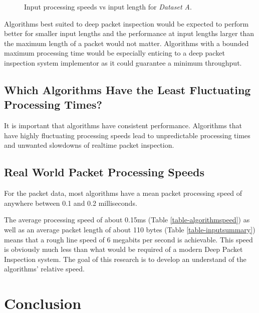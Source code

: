 \documentclass[11pt]{article}
\begin{document}
\begin{figure}[t]
    \centering
    
    \caption{Input processing speeds vs input length for \textit{Dataset A}.}
\end{figure}

Algorithms best suited to deep packet inspection would be expected to perform better for smaller input lengths and the performance at input lengths larger than the maximum length of a packet would not matter. Algorithms with a bounded maximum processing time would be especially enticing to a deep packet inspection system implementor as it could guarantee a minimum throughput.

\subsection{Which Algorithms Have the Least Fluctuating Processing Times?}

It is important that algorithms have consistent performance. Algorithms that have highly fluctuating processing speeds lead to unpredictable processing times and unwanted slowdowns of realtime packet inspection.

\subsection{Real World Packet Processing Speeds}

For the packet data, most algorithms have a mean packet processing speed of anywhere between 0.1 and 0.2 milliseconds.

The average processing speed of about 0.15ms (Table \ref{table-algorithmspeed}) as well as an average packet length of about 110 bytes (Table \ref{table-inputsummary}) means that a rough line speed of 6 megabits per second is achievable. This speed is obviously much less than what would be required of a modern Deep Packet Inspection system. The goal of this research is to develop an understand of the algorithms' relative speed.

\section{Conclusion}



\end{document}

